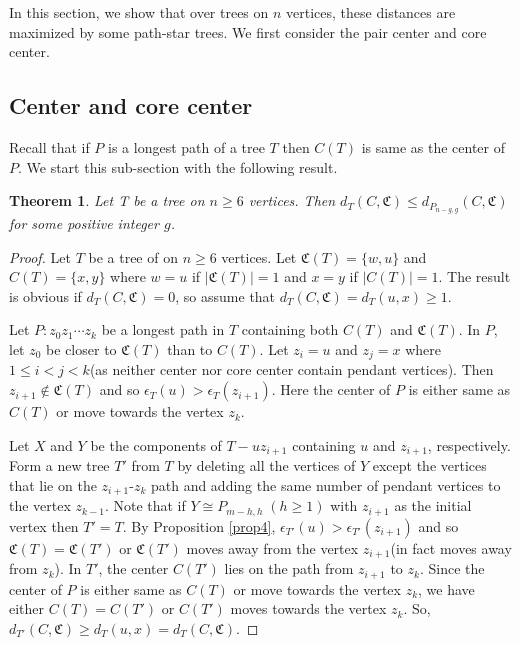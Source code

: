 \documentclass[11pt]{article}
\newtheorem{theorem}{Theorem}[section]
\begin{document}
In this section, we show that over trees on $n$ vertices, these distances are maximized by some path-star trees. We first consider the pair center and core center.

\subsection{Center and core center}

Recall that if $P$ is a longest path of a tree $T$ then $C(T)$ is same as the center of $P$. We start this sub-section with the following result.
\begin{theorem}\label{thm:cc1}
Let T be a tree on $n\geq 6$ vertices. Then  $d_T(C,\mathfrak{C})\leq d_{P_{n-g,g}}(C,\mathfrak{C})$ for some positive integer $g$.
\end{theorem}
\begin{proof}
Let $T$ be a tree of on $n\geq 6$ vertices. Let $\mathfrak{C}(T)=\{w,u\}$ and $C(T)=\{x,y\}$ where $w=u$ if $|\mathfrak{C}(T)|=1$ and $x=y$ if $|C(T)|=1$.  The result is obvious if $d_T(C,\mathfrak{C})=0$, so assume that  $d_T(C,\mathfrak{C})=d_T(u,x)\geq 1$.

Let $P:z_0z_1 \cdots z_k$ be a longest path in $T$ containing both $C(T)$ and $\mathfrak{C}(T)$. In $P$, let $z_0$ be closer to $\mathfrak{C}(T)$ than to $C(T)$. Let $z_i=u$ and $z_j=x$ where $1\leq i<j<k$(as neither center nor core center contain pendant vertices). Then $z_{i+1}\notin \mathfrak{C}(T)$ and so  $\epsilon_T(u)>\epsilon_T(z_{i+1})$. Here the center of $P$ is either same as $C(T)$ or move towards the vertex $z_k$.

Let $X$ and $Y$ be the components of $T-uz_{i+1}$ containing $u$ and $z_{i+1}$, respectively. Form  a new tree $T'$ from $T$ by deleting all the vertices of $Y$ except the vertices that lie on the $z_{i+1}$-$z_k$ path and adding the same number of pendant vertices to the vertex $z_{k-1}$. Note that if $Y\cong P_{m-h,h}\;(h\geq 1)$ with $z_{i+1}$ as the initial vertex then $T'=T.$ By Proposition \ref{prop4}, $\epsilon_{T'}(u)>\epsilon_{T'}(z_{i+1})$ and so $\mathfrak{C}(T)=\mathfrak{C}(T')$ or $\mathfrak{C}(T')$ moves away from the vertex $z_{i+1}$(in fact moves away from $z_k$). In $T'$, the center $C(T')$ lies on the path from $z_{i+1}$ to $z_k$. Since the center of $P$ is either same as $C(T)$ or move towards the vertex $z_k$, we have  either $C(T)=C(T')$ or $C(T')$ moves towards the vertex $z_k$. So, $d_{T'}(C,\mathfrak{C})\geq d_T(u,x)=d_T(C,\mathfrak{C})$.


\end{proof}
\end{document}
